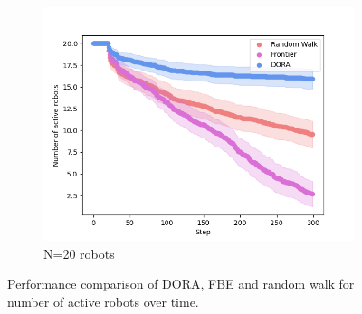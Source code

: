 \documentclass[letterpaper, 10 pt, conference]{ieeeconf}
\begin{document}
\begin{figure}
\begin{subfigure}{0.32\textwidth}
        \includegraphics[width=\textwidth]{images/activerobots_20.png}
        \caption{N=20 robots}
        \label{results:failures20}
    \end{subfigure}
    \caption{Performance comparison of DORA, FBE and random walk for number of active robots over time.}
\end{figure}
\end{document}
